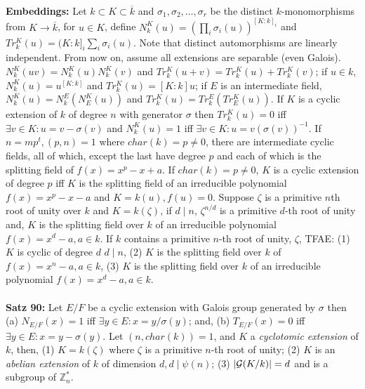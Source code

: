 \\
{\bf Embeddings:}
Let $k \subset K \subset {\overline k}$ and 
$\sigma_1, \sigma_2, \ldots , \sigma_r$ 
be the distinct $k$-monomorphisms from $K \rightarrow {\overline k}$, for
$u \in K$,
define 
$N_k^K(u) = (\prod_{i} \sigma_i(u))^{[K:k]_i}$ and
$Tr_k^K(u) = (K:k]_i \sum_{i} \sigma_i(u)$.  Note that distinct automorphisms are
linearly independent.  From now on, assume all extensions are separable (even Galois).
$N_k^K (uv)= N_k^K(u) N_k^K(v)$ and
$Tr_k^K (u+v)= Tr_k^K(u) + Tr_k^K(v)$; if $u \in k$,
$N_k^K (u)= u^{[K:k]}$ and
$Tr_k^K (u)= [K:k]u$; if $E$ is an intermediate field,
$N_k^K (u)= N_k^E(N_E^K(u))$ and
$Tr_k^K (u)= Tr_k^E(Tr_E^K(u))$.  If $K$ is a cyclic extension of $k$ of degree
$n$ with generator $\sigma$
then $Tr_k^K(u) = 0$ iff $\exists v \in K: u= v - \sigma(v)$ and
$N_k^K(u) = 1$ iff $\exists v \in K: u= v(\sigma(v))^{-1}$.  If $n= mp^t, (p,n)=1$
where $char(k)=p \ne 0$, there are intermediate cyclic fields, all
of which, except the last have degree $p$ and
each of which is the splitting field of $f(x)= x^p-x+a$.
If $char(k)=p \ne 0$, $K$ is a cyclic extension of degree $p$ iff
$K$ is the splitting field of an irreducible polynomial
$f(x)= x^p -x - a$ and $K=k(u), f(u)=0$.
Suppose $\zeta$ is a primitive $n$th root of unity over $k$ and $K= k(\zeta)$,
if $d \mid n$, $\zeta^{n/d}$ is a primitive $d$-th root of unity and,
$K$ is the splitting field over $k$ of an irreducible polynomial
$f(x)= x^d-a, a \in k$.
If $k$ contains a primitive  $n$-th root of unity, $\zeta$,
TFAE: (1) $K$ is cyclic of degree $d$
$d \mid n$,
(2) $K$ is the splitting field over $k$ of $f(x)= x^n-a, a \in k$,
(3) $K$ is the splitting field over $k$ of an irreducible polynomial
$f(x)= x^d-a, a \in k$.
\\
\\
{\bf Satz 90:}  Let $E/F$ be a cyclic extension with Galois group generated by
$\sigma$ then 
(a) $N_{E/F}(x)= 1$ iff $\exists y \in E: x= y/\sigma(y)$; and,
(b) $T_{E/F}(x)= 0$ iff $\exists y \in E: x= y - \sigma(y)$.
Let $(n, char(k))= 1$, and $K$ a \emph{cyclotomic extension} of $k$, then,
(1) $K= k(\zeta)$ where $\zeta$ is a primitive $n$-th root of unity;
(2) $K$ is an \emph{abelian extension} of $k$ of dimension $d, d \mid \psi(n)$;
(3) $|{\cal G}(K/k)|=d$ and is a subgroup of ${\mathbb Z}_n^*$.
